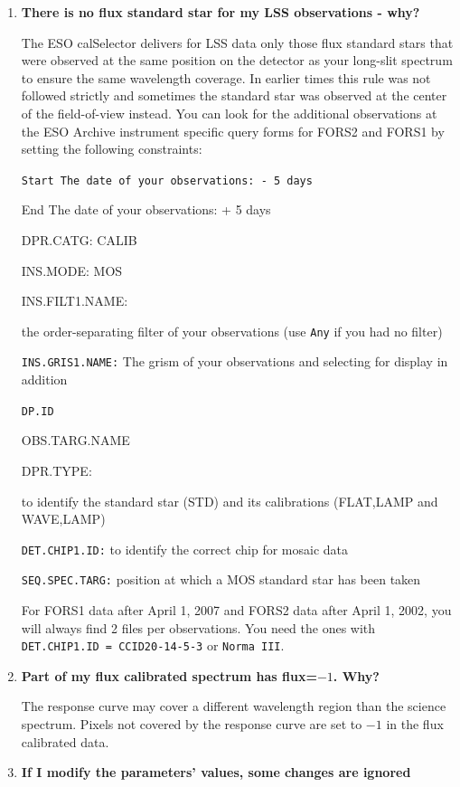 \begin{enumerate}
There are currently no master response curves for the grisms GRIS\_1200g, GRIS\_200I+OG590, GRIS\_600I+OG590, GRIS\_600R+GG435, GRIS\_600V+GG435, nor for any spectra observed before January 1, 2015.

\item {\bf There is no flux standard star for my LSS observations - why?}

The ESO calSelector delivers for LSS data only those flux standard stars that were observed at the same position on the detector as your long-slit spectrum to ensure the same wavelength coverage. In earlier times this rule was not followed strictly and sometimes the standard star was observed at the center of the field-of-view
instead. You can look for the additional observations at the ESO Archive instrument specific query forms for FORS2 and FORS1 by setting the following constraints:

{\tt Start The date of your observations: - 5 days

End The date of your observations: + 5 days

DPR.CATG: CALIB

INS.MODE: MOS

INS.FILT1.NAME:} the order-separating filter of your observations (use {\tt Any} if you had no filter)

{\tt INS.GRIS1.NAME:} The grism of your observations and selecting for display in addition

{\tt DP.ID

OBS.TARG.NAME

DPR.TYPE:} to identify the standard star (STD) and its calibrations (FLAT,LAMP and WAVE,LAMP)

{\tt DET.CHIP1.ID:} to identify the correct chip for mosaic data

{\tt SEQ.SPEC.TARG:} position at which a MOS standard star has been taken

For FORS1 data after April 1, 2007 and FORS2 data after April 1, 2002, you will always find 2 files per observations. You need the ones with {\tt DET.CHIP1.ID = CCID20-14-5-3} or {\tt Norma III}.


\item {\bf Part of my flux calibrated spectrum has flux=$-1$. Why?}

The response curve may cover a different wavelength region than the science spectrum. Pixels not covered by the response curve are set to $-1$ in the flux calibrated data.

\item {\bf If I modify the parameters' values, some changes are ignored}


\end{enumerate}
